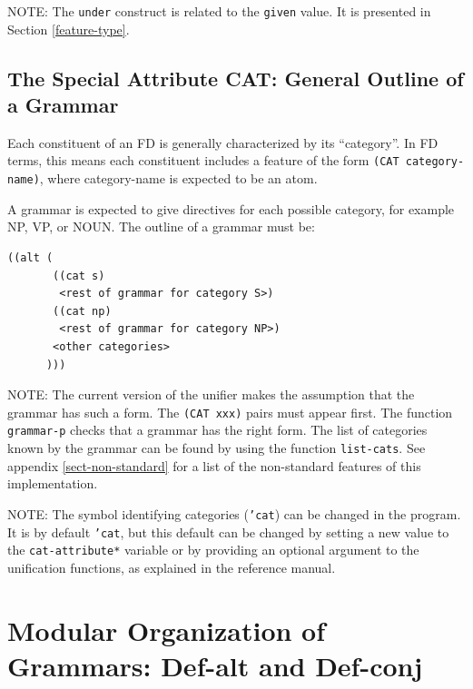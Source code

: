 \documentclass[10pt,a4paper]{report}
\begin{document}
NOTE: The {\tt under} construct is related to the {\tt given} value.  It is
presented in Section \ref{feature-type}.  




\section{The Special Attribute CAT: General Outline of a Grammar}

Each constituent of an FD is generally characterized by its ``category''.
In FD terms, this means each constituent includes a feature of the
form {\tt (CAT category-name)}, where category-name is expected to be an atom.

A grammar is expected to give directives for each possible category, for
example NP, VP, or NOUN. The outline of a grammar must be:

\begin{lstlisting}[language=Lisp]
((alt (
       ((cat s)
        <rest of grammar for category S>)
       ((cat np)
        <rest of grammar for category NP>)
       <other categories>
      )))
\end{lstlisting}

NOTE: The current version of the unifier makes the assumption that the
grammar has such a form. The {\tt (CAT xxx)} pairs must appear first.  The
function {\tt grammar-p} checks that a grammar has the right form.  The list
of categories known by the grammar can be found by using the function
{\tt list-cats}. See appendix \ref{sect-non-standard} for a list of the
non-standard features of this implementation.

NOTE: The symbol identifying categories ({\tt 'cat}) can be changed in the
program.  It is by default {\tt 'cat}, but this default can be changed by
setting a new value to the {\tt *cat-attribute*} variable or by providing an
optional argument to the unification functions, as explained in the
reference manual.  
\label{cat-attribute}


\chapter{Modular Organization of Grammars: Def-alt and Def-conj}
\label{def-alt}
\end{document}
